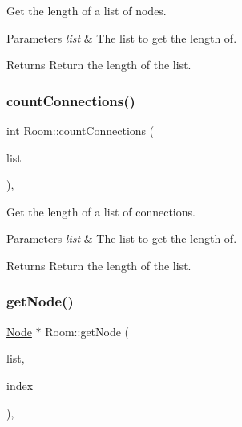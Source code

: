 Get the length of a list of nodes. 


\begin{DoxyParams}{Parameters}
{\em list} & The list to get the length of. \\
\hline
\end{DoxyParams}
\begin{DoxyReturn}{Returns}
Return the length of the list. 
\end{DoxyReturn}
\mbox{\label{classRoom_aaf0c2179afdb30a0a76fb926b403a19b}} 
\subsubsection{\texorpdfstring{count\+Connections()}{countConnections()}}
{\footnotesize\ttfamily int Room\+::count\+Connections (\begin{DoxyParamCaption}\item[{Q\+Qml\+List\+Property$<$ \mbox{\hyperlink{classConnection}{Connection}} $>$ $\ast$}]{list }\end{DoxyParamCaption})\hspace{0.3cm}{\ttfamily [static]}, {\ttfamily [private]}}



Get the length of a list of connections. 


\begin{DoxyParams}{Parameters}
{\em list} & The list to get the length of. \\
\hline
\end{DoxyParams}
\begin{DoxyReturn}{Returns}
Return the length of the list. 
\end{DoxyReturn}
\mbox{\label{classRoom_a89d62f69e6278b5d725b4c15ab21e12c}} 
\subsubsection{\texorpdfstring{get\+Node()}{getNode()}}
{\footnotesize\ttfamily \mbox{\hyperlink{classNode}{Node}} $\ast$ Room\+::get\+Node (\begin{DoxyParamCaption}\item[{Q\+Qml\+List\+Property$<$ \mbox{\hyperlink{classNode}{Node}} $>$ $\ast$}]{list,  }\item[{int}]{index }\end{DoxyParamCaption})\hspace{0.3cm}{\ttfamily [static]}, {\ttfamily [private]}}



